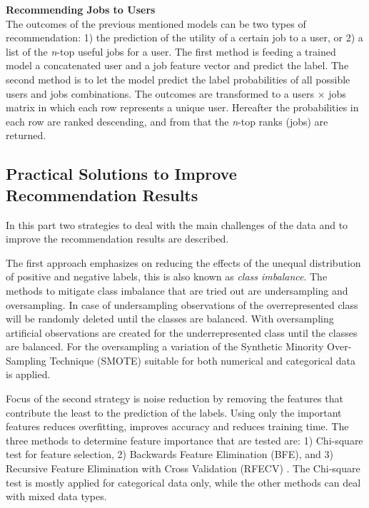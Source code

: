 \noindent
\textbf{Recommending Jobs to Users} \\
The outcomes of the previous mentioned models can be two types of recommendation: 1) the prediction of the utility of a certain job to a user, or 2) a list of the \textit{n}-top useful jobs for a user.
The first method is feeding a trained model a concatenated user and a job feature vector and predict the label.
The second method is to let the model predict the label probabilities of all possible users and jobs combinations. 
The outcomes are transformed to a users $\times$ jobs matrix in which each row represents a unique user.
Hereafter the probabilities in each row are ranked descending, and from that the \textit{n}-top ranks (jobs) are returned. 

\subsection{Practical Solutions to Improve Recommendation Results}
\label{ssec:psirr}
In this part two strategies to deal with the main challenges of the data and to improve the recommendation results are described.

The first approach emphasizes on reducing the effects of the unequal distribution of positive and negative labels, this is also known as \textit{class imbalance}. 
The methods to mitigate class imbalance that are tried out are undersampling and oversampling. 
In case of undersampling observations of the overrepresented class will be randomly deleted until the classes are balanced. 
With oversampling artificial observations are created for the underrepresented class until the classes are balanced. 
For the oversampling a variation of the Synthetic Minority Over-Sampling Technique (SMOTE) \cite{chawla2002smote} suitable for both numerical and categorical data is applied. 

Focus of the second strategy is noise reduction by removing the features that contribute the least to the prediction of the labels.
Using only the important features reduces overfitting, improves accuracy and reduces training time. 
The three methods to determine feature importance that are tested are: 1) Chi-square test for feature selection, 2) Backwards Feature Elimination (BFE), and 3) Recursive Feature Elimination with Cross Validation (RFECV) \cite{guyon2002gene}. 
The Chi-square test is mostly applied for categorical data only, while the other methods can deal with mixed data types.
